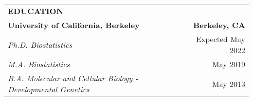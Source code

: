 \begin{center}
    \begin{tabularx}{\textwidth}{L R}
        {\large \textbf{EDUCATION}} & \\
        \textbf{University of California, Berkeley} & \textbf{Berkeley, CA} \\
        \small \textit{Ph.D. Biostatistics} & \small Expected May 2022 \\
        \small \textit{M.A. Biostatistics} & \small May 2019 \\
        \small \textit{B.A. Molecular and Cellular Biology - Developmental Genetics} & \small May 2013 \\
    \end{tabularx}
\end{center}